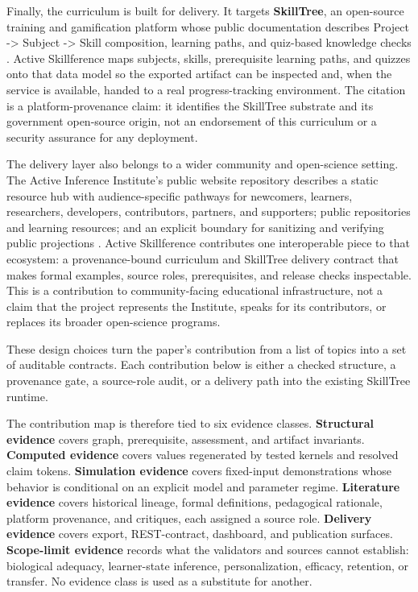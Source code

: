 \documentclass[
  english,
]{article}
\begin{document}
Finally, the curriculum is built for delivery. It targets
\textbf{SkillTree}, an open-source training and gamification platform
whose public documentation describes Project -\textgreater{} Subject
-\textgreater{} Skill composition, learning paths, and quiz-based
knowledge checks
\citep{skilltree2020nsa, skilltree2026docs, skilltree2026github, nsa2026opensource}.
Active Skillference maps subjects, skills, prerequisite learning paths,
and quizzes onto that data model so the exported artifact can be
inspected and, when the service is available, handed to a real
progress-tracking environment. The citation is a platform-provenance
claim: it identifies the SkillTree substrate and its government
open-source origin, not an endorsement of this curriculum or a security
assurance for any deployment.

The delivery layer also belongs to a wider community and open-science
setting. The Active Inference Institute's public website repository
describes a static resource hub with audience-specific pathways for
newcomers, learners, researchers, developers, contributors, partners,
and supporters; public repositories and learning resources; and an
explicit boundary for sanitizing and verifying public projections
\citep{activeinferenceinstitute2026website}. Active Skillference
contributes one interoperable piece to that ecosystem: a
provenance-bound curriculum and SkillTree delivery contract that makes
formal examples, source roles, prerequisites, and release checks
inspectable. This is a contribution to community-facing educational
infrastructure, not a claim that the project represents the Institute,
speaks for its contributors, or replaces its broader open-science
programs.

These design choices turn the paper's contribution from a list of topics
into a set of auditable contracts. Each contribution below is either a
checked structure, a provenance gate, a source-role audit, or a delivery
path into the existing SkillTree runtime.

The contribution map is therefore tied to six evidence classes.
\textbf{Structural evidence} covers graph, prerequisite, assessment, and
artifact invariants. \textbf{Computed evidence} covers values
regenerated by tested kernels and resolved claim tokens.
\textbf{Simulation evidence} covers fixed-input demonstrations whose
behavior is conditional on an explicit model and parameter regime.
\textbf{Literature evidence} covers historical lineage, formal
definitions, pedagogical rationale, platform provenance, and critiques,
each assigned a source role. \textbf{Delivery evidence} covers export,
REST-contract, dashboard, and publication surfaces. \textbf{Scope-limit
evidence} records what the validators and sources cannot establish:
biological adequacy, learner-state inference, personalization, efficacy,
retention, or transfer. No evidence class is used as a substitute for
another.
\end{document}
